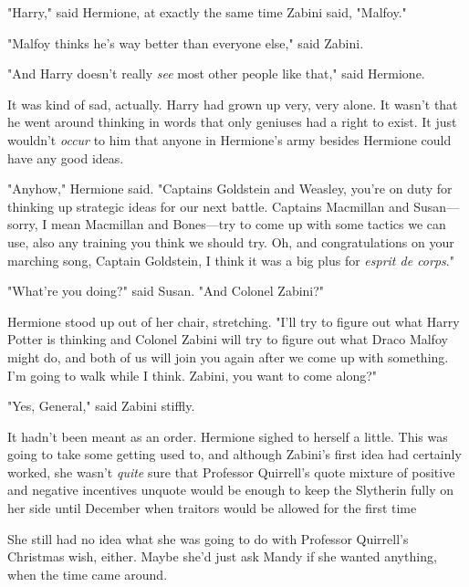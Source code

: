 "Harry," said Hermione, at exactly the same time Zabini said, "Malfoy."

"Malfoy thinks he's way better than everyone else," said Zabini.

"And Harry{\el} doesn't really \emph{see} most other people like that," said
Hermione.

It was kind of sad, actually. Harry had grown up very, very alone. It wasn't
that he went around thinking in words that only geniuses had a right to exist.
It just wouldn't \emph{occur} to him that anyone in Hermione's army besides
Hermione could have any good ideas.

"Anyhow," Hermione said. "Captains Goldstein and Weasley, you're on duty for
thinking up strategic ideas for our next battle. Captains Macmillan and
Susan—sorry, I mean Macmillan and Bones—try to come up with some tactics we
can use, also any training you think we should try. Oh, and congratulations on
your marching song, Captain Goldstein, I think it was a big plus for
\emph{esprit de corps}."

"What're you doing?" said Susan. "And Colonel Zabini?"

Hermione stood up out of her chair, stretching. "I'll try to figure out what
Harry Potter is thinking and Colonel Zabini will try to figure out what Draco
Malfoy might do, and both of us will join you again after we come up with
something. I'm going to walk while I think. Zabini, you want to come along?"

"Yes, General," said Zabini stiffly.

It hadn't been meant as an order. Hermione sighed to herself a little. This was
going to take some getting used to, and although Zabini's first idea had
certainly worked, she wasn't \emph{quite} sure that Professor Quirrell's quote
mixture of positive and negative incentives unquote would be enough to keep the
Slytherin fully on her side until December when traitors would be allowed for
the first time{\el}

She still had no idea what she was going to do with Professor Quirrell's
Christmas wish, either. Maybe she'd just ask Mandy if she wanted anything, when
the time came around.
